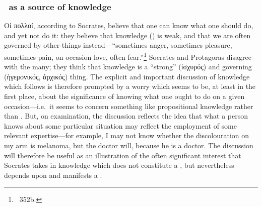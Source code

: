 \documentclass[11pt,letterpaper,oneside]{amsart} %
\begin{document}
\subsubsection*{\techne\ as a source of knowledge} Οἱ πολλοί, according to Socrates, believe that one can know what one should do, and yet not do it: they believe that knowledge (\ie \episteme) is weak, and that we are often governed by other things instead---``sometimes anger, sometimes pleasure, sometimes pain, on occasion love, often fear.''\footnote{\prot\ 352b.} Socrates and Protagoras disagree with the many; they think that knowledge is a  ``strong'' (ἰσχυρός) and governing (ἡγεμονικός, ἀρχικός) thing. The explicit and important discussion of knowledge which follows is therefore prompted by a worry which seems to be, at least in the first place, about the significance of knowing what one ought to do on a given occasion---i.e.\ it seems to concern something like propositional knowledge rather than \techne. But, on examination, the discussion reflects the idea that what a person knows about some particular situation may reflect the employment of some relevant expertise---for example, I may not know whether the discolouration on my arm is melanoma, but the doctor will, because he is a doctor. The discussion will therefore be useful as an illustration of the often significant interest that Socrates takes in knowledge which does not constitute a \techne, but nevertheless depends upon and manifests a \techne.





\end{document}

